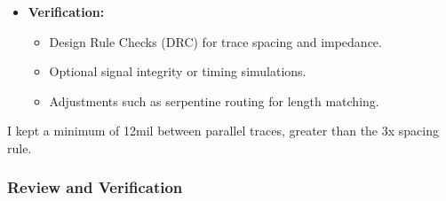 \documentclass[10pt]{article}
\begin{document}
\begin{itemize}
    \item \textbf{Verification:} 
        \begin{itemize}
            \item Design Rule Checks (DRC) for trace spacing and impedance.
            \item Optional signal integrity or timing simulations.
            \item Adjustments such as serpentine routing for length matching.
        \end{itemize}
\end{itemize}

I kept a minimum of 12mil between parallel traces, greater than the 3x spacing rule.

\subsubsection{Review and Verification}
\end{document}
